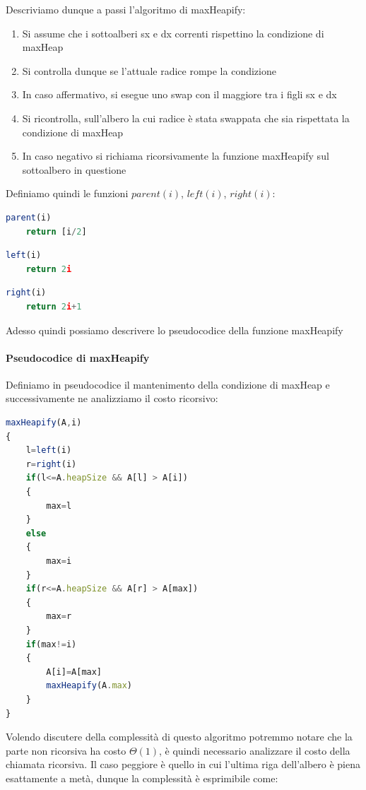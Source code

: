 \documentclass{article}
\begin{document}
Descriviamo dunque a passi l'algoritmo di maxHeapify:

\begin{enumerate}
    \item Si assume che i sottoalberi sx e dx correnti rispettino la condizione di maxHeap
    \item Si controlla dunque se l'attuale radice rompe la condizione
    \item In caso affermativo, si esegue uno swap con il maggiore tra i figli sx e dx
    \item Si ricontrolla, sull'albero la cui radice è stata swappata che sia rispettata la condizione di maxHeap
    \item In caso negativo si richiama ricorsivamente la funzione maxHeapify sul sottoalbero in questione
\end{enumerate}

Definiamo quindi le funzioni $parent(i)$, $left(i)$, $right(i)$:

\begin{lstlisting}[language=JavaScript]
parent(i)
    return [i/2]
\end{lstlisting}

\begin{lstlisting}[language=JavaScript]
left(i)
    return 2i
\end{lstlisting}

\begin{lstlisting}[language=JavaScript]
right(i)
    return 2i+1
\end{lstlisting}

Adesso quindi possiamo descrivere lo pseudocodice della funzione maxHeapify

\newpage

\paragraph{Pseudocodice di maxHeapify} Definiamo in pseudocodice il mantenimento della condizione di maxHeap e successivamente ne analizziamo il costo ricorsivo:

\begin{lstlisting}[language=JavaScript]
maxHeapify(A,i)
{
	l=left(i)
	r=right(i)
	if(l<=A.heapSize && A[l] > A[i])
	{
		max=l
	}
	else
	{
		max=i
	}
	if(r<=A.heapSize && A[r] > A[max])
	{
		max=r
	}
	if(max!=i)
	{
		A[i]=A[max]
		maxHeapify(A.max)
	}
}

\end{lstlisting}

Volendo discutere della complessità di questo algoritmo potremmo notare che la parte non ricorsiva ha costo $\Theta(1)$, è quindi necessario analizzare il costo della chiamata ricorsiva. Il caso peggiore è quello in cui l'ultima riga dell'albero è piena esattamente a metà, dunque la complessità è esprimibile come:
\end{document}
